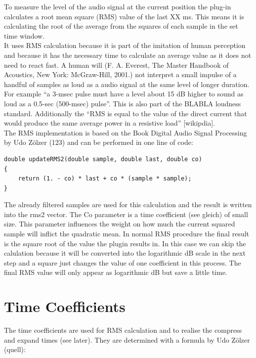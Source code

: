 To measure the level of the audio signal at the current position the plug-in calculates a root mean square (RMS) value of the last XX ms. This means it is calculating the root of the average from the squares of each sample in the set time window.\\
It uses RMS calculation because it is part of the imitation of human perception and because it has the necessary time to calculate an average value as it does not need to react fast. A human will (F. A. Everest, The Master Handbook of Acoustics, New York: McGraw-Hill, 2001.) not interpret a small impulse of a handful of samples as loud as a audio signal at the same level of longer duration.  For example “a 3-msec pulse must have a level about 15 dB higher to sound as loud as a 0.5-sec (500-msec) pulse”. This is also part of the BLABLA loudness standard. Additionally the “RMS is equal to the value of the direct current that would produce the same average power in a resistive load” [wikipdia].\\
The RMS implementation is based on the Book Digital Audio Signal Processing by Udo Zölzer (123) and can be performed in one line of code:\\

\begin{lstlisting}[frame=single]
double updateRMS2(double sample, double last, double co)
{
    return (1. - co) * last + co * (sample * sample);
}
\end{lstlisting}

The already filtered samples are used for this calculation and the result is written into the rms2 vector. The Co parameter is a time coefficient (see gleich) of small size. This parameter influences the weight on how much the current squared sample will inflict the quadratic mean. In normal RMS procedure the final result is the square root of the value the plugin results in. In this case we can skip the calulation because it will be converted into the logarithmic dB scale in the next step and a square just changes the value of one coefficient in this process. The final RMS value will only appear as logarithmic dB but save a little time.\\

\section{Time Coefficients}

The time coefficients are used for RMS calculation and to realise the compress and expand times (see later). They are determined with a formula by Udo Zölzer (quell):

